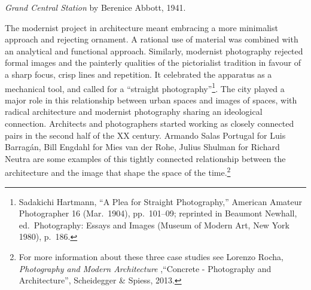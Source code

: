\documentclass[
  openany]{book}
\begin{document}
\emph{Grand Central Station} by Berenice Abbott, 1941.

The modernist project in architecture meant embracing a more minimalist approach and rejecting ornament. A rational use of material was combined with an analytical and functional approach. Similarly, modernist photography rejected formal images and the painterly qualities of the pictorialist tradition in favour of a sharp focus, crisp lines and repetition. It celebrated the apparatus as a mechanical tool, and called for a ``straight photography''\footnote{Sadakichi Hartmann, ``A Plea for Straight Photography,'' American Amateur Photographer 16 (Mar.~1904), pp.~101--09; reprinted in Beaumont Newhall, ed.~Photography: Essays and Images (Museum of Modern Art, New York 1980), p.~186.}. The city played a major role in this relationship between urban spaces and images of spaces, with radical architecture and modernist photography sharing an ideological connection. Architects and photographers started working as closely connected pairs in the second half of the XX century. Armando Salas Portugal for Luis Barragán, Bill Engdahl for Mies van der Rohe, Julius Shulman for Richard Neutra are some examples of this tightly connected relationship between the architecture and the image that shape the space of the time.\footnote{For more information about these three case studies see Lorenzo Rocha, \emph{Photography and Modern Architecture} ,``Concrete - Photography and Architecture'', Scheidegger \& Spiess, 2013.}
\end{document}
